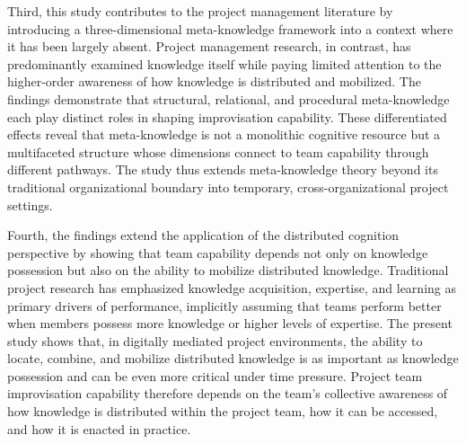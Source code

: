 \documentclass[authoryear,preprint,review,times,10pt]{elsarticle}
\begin{document}
Third, this study contributes to the project management literature by introducing a three-dimensional meta-knowledge framework into a context where it has been largely absent. Project management research, in contrast, has predominantly examined knowledge itself while paying limited attention to the higher-order awareness of how knowledge is distributed and mobilized. The findings demonstrate that structural, relational, and procedural meta-knowledge each play distinct roles in shaping improvisation capability. These differentiated effects reveal that meta-knowledge is not a monolithic cognitive resource but a multifaceted structure whose dimensions connect to team capability through different pathways. The study thus extends meta-knowledge theory beyond its traditional organizational boundary into temporary, cross-organizational project settings.

Fourth, the findings extend the application of the distributed cognition perspective by showing that team capability depends not only on knowledge possession but also on the ability to mobilize distributed knowledge. Traditional project research has emphasized knowledge acquisition, expertise, and learning as primary drivers of performance, implicitly assuming that teams perform better when members possess more knowledge or higher levels of expertise. The present study shows that, in digitally mediated project environments, the ability to locate, combine, and mobilize distributed knowledge is as important as knowledge possession and can be even more critical under time pressure. Project team improvisation capability therefore depends on the team's collective awareness of how knowledge is distributed within the project team, how it can be accessed, and how it is enacted in practice.
\end{document}
